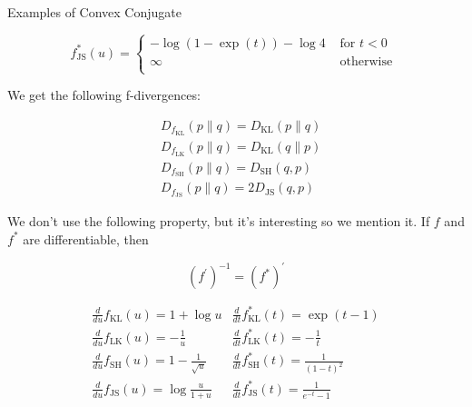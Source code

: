 \begin{frame}[allowframebreaks]
\begin{myexampleblock}{12.20}{Examples of Convex Conjugate}
\begin{itemize}
        $$
        f_{\mathrm{JS}}^{*}(u)=
        \begin{cases}
        -\log (1-\exp (t))-\log 4 & \text { for } t < 0 \\
        \infty & \text { otherwise } \\
        \end{cases}
        $$
    \end{itemize}

    We get the following f-divergences:

    $$
    \begin{aligned}
    & D_{f_{\mathrm{KL}}}(p \| q)=D_{\mathrm{KL}}(p \| q) \\
    & D_{f_{\mathrm{LK}}}(p \| q)=D_{\mathrm{KL}}(q \| p) \\
    & D_{f_{\mathrm{SH}}}(p \| q)=D_{\mathrm{SH}}(q, p) \\
    & D_{f_{\mathrm{JS}}}(p \| q)=2 D_{\mathrm{JS}}(q, p)
    \end{aligned}
    $$

    We don't use the following property, but it's interesting so we mention it. If $f$ and $f^{*}$ are differentiable, then

    $$
    \left(f^{\prime}\right)^{-1}=\left(f^{*}\right)^{\prime}
    $$

    $$
    \begin{array}{ll}
    \frac{d}{d u} f_{\mathrm{KL}}(u)=1+\log u & \frac{d}{d t} f_{\mathrm{KL}}^{*}(t)=\exp (t-1) \\
    \frac{d}{d u} f_{\mathrm{LK}}(u)=-\frac{1}{u} & \frac{d}{d t} f_{\mathrm{LK}}^{*}(t)=-\frac{1}{t} \\
    \frac{d}{d u} f_{\mathrm{SH}}(u)=1-\frac{1}{\sqrt{u}} & \frac{d}{d t} f_{\mathrm{SH}}^{*}(t)=\frac{1}{(1-t)^{2}} \\
    \frac{d}{d u} f_{\mathrm{JS}}(u)=\log \frac{u}{1+u} & \frac{d}{d t} f_{\mathrm{JS}}^{*}(t)=\frac{1}{e^{-t}-1}
    \end{array}
    $$
\end{myexampleblock}

\end{frame}

